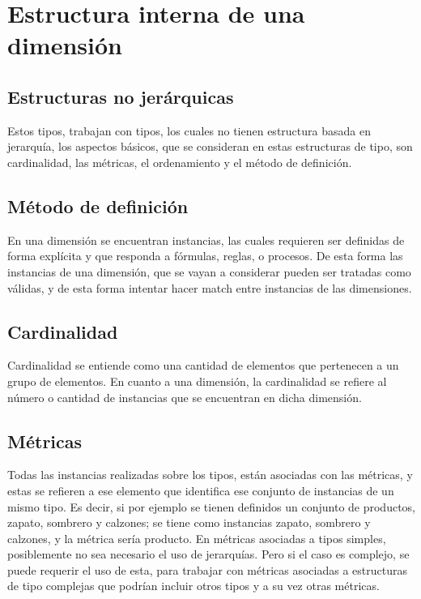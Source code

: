 \documentclass[DIV=calc, paper=a4, fontsize=11pt, twocolumn]{scrartcl}	 %
\begin{document}
\section*{Estructura interna de una dimensi\'{o}n}


\subsection*{Estructuras no jer\'{a}rquicas}
Estos tipos, trabajan con tipos, los cuales no tienen estructura basada en jerarquía, los aspectos b\'{a}sicos, que se consideran en estas estructuras de tipo, son cardinalidad, las m\'{e}tricas, el ordenamiento y el m\'{e}todo de definici\'{o}n.

\subsection*{M\'{e}todo de definici\'{o}n}
En una dimensi\'{o}n se encuentran instancias, las cuales requieren ser definidas de forma expl\'{i}cita  y que responda a f\'{o}rmulas, reglas, o procesos. De esta forma las instancias de una dimensi\'{o}n, que se vayan a considerar pueden ser tratadas como v\'{a}lidas, y de esta forma intentar hacer match entre instancias de  las dimensiones.
 
\subsection*{Cardinalidad}
Cardinalidad se entiende como una cantidad de elementos que pertenecen a un grupo de elementos. En cuanto a una dimensi\'{o}n, la cardinalidad se refiere al n\'{u}mero o cantidad de instancias que se encuentran en dicha dimensi\'{o}n.

\subsection*{M\'{e}tricas} 
Todas las instancias realizadas sobre los tipos, están asociadas con las m\'{e}tricas, y estas se refieren a ese elemento que identifica ese conjunto de instancias de un mismo tipo. Es decir, si por ejemplo se tienen definidos un conjunto de productos, zapato, sombrero y calzones; se tiene como instancias zapato, sombrero y calzones, y la m\'{e}trica ser\'{i}a producto.
En m\'{e}tricas asociadas a tipos simples, posiblemente no sea necesario el uso de jerarqu\'{i}as. Pero  si el caso es complejo, se puede requerir el uso de esta, para trabajar con m\'{e}tricas asociadas a estructuras de tipo complejas que podr\'{i}an incluir otros tipos y a su vez otras m\'{e}tricas.
\end{document}
